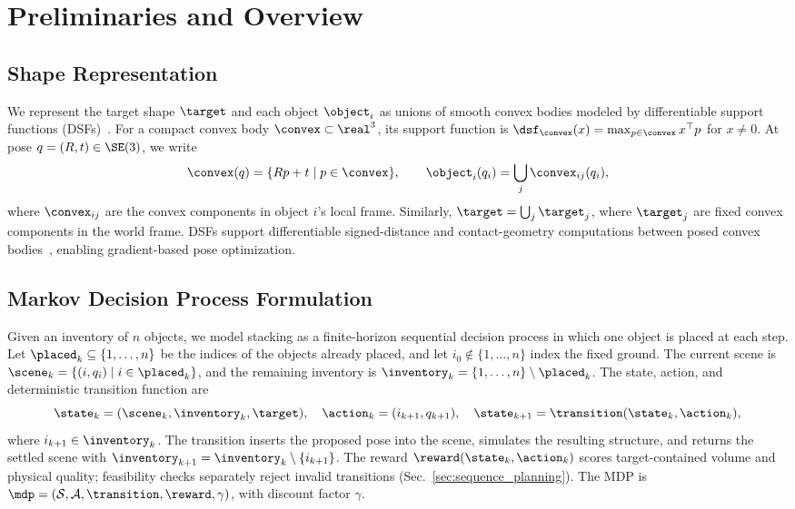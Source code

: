 \section{Preliminaries and Overview} \label{sec:overview}

\subsection{Shape Representation}
We represent the target shape $\target$ and each object $\object_i$ as unions of smooth convex bodies modeled by differentiable support functions (DSFs)~\cite{lee2023uncertain}.
For a compact convex body $\convex\subset\real^3$, its support function is $\dsf_\convex(x)=\max_{p\in\convex}x^\top p$ for $x\ne0$.
At pose $q=(R,t)\in\SE(3)$, we write
\begin{equation*}
    \convex(q)=\{Rp+t\mid p\in\convex\},
    \qquad \object_i(q_i)=\bigcup_j\convex_{ij}(q_i),
\end{equation*}
where $\convex_{ij}$ are the convex components in object $i$'s local frame.
Similarly, $\target=\bigcup_j\target_j$, where $\target_j$ are fixed convex components in the world frame.
DSFs support differentiable signed-distance and contact-geometry computations between posed convex bodies~\cite{an2024riemannianmtd}, enabling gradient-based pose optimization.


\subsection{Markov Decision Process Formulation}

Given an inventory of $n$ objects, we model stacking as a finite-horizon sequential decision process in which one object is placed at each step.
Let $\placed_k\subseteq\{1,\ldots,n\}$ be the indices of the objects already placed, and let $i_0\notin\{1,\ldots,n\}$ index the fixed ground.
The current scene is $\scene_k=\{(i,q_i)\mid i\in\placed_k\}$, and the remaining inventory is $\inventory_k=\{1,\ldots,n\}\setminus\placed_k$.
The state, action, and deterministic transition function are
\begin{equation*}
    \state_k=(\scene_k,\inventory_k,\target),\quad
    \action_k=(i_{k+1},q_{k+1}),\quad
    \state_{k+1}=\transition(\state_k,\action_k),
\end{equation*}
where $i_{k+1}\in\inventory_k$. The transition inserts the proposed pose into the scene, simulates the resulting structure, and returns the settled scene with $\inventory_{k+1}=\inventory_k\setminus\{i_{k+1}\}$. 
The reward $\reward(\state_k,\action_k)$ scores target-contained volume and physical quality; feasibility checks separately reject invalid transitions (Sec.~\ref{sec:sequence_planning}).
The MDP is $\mdp=(\mathcal{S},\mathcal{A},\transition,\reward,\gamma)$, with discount factor $\gamma$.

